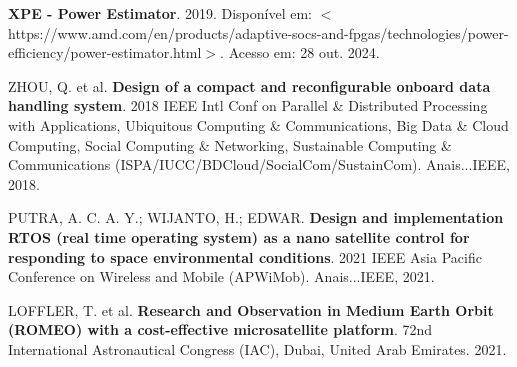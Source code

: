 \begin{flushleft}
\begin{thebibliography}{00}
 \textbf{XPE - Power Estimator}. 2019. Disponível em: $<$https://www.amd.com/en/products/adaptive-socs-and-fpgas/technologies/power-efficiency/power-estimator.html$>$. Acesso em: 28 out. 2024.





 ZHOU, Q. et al. \textbf{Design of a compact and reconfigurable onboard data handling system}. 2018 IEEE Intl Conf on Parallel \& Distributed Processing with Applications, Ubiquitous Computing \& Communications, Big Data \& Cloud Computing, Social Computing \& Networking, Sustainable Computing \& Communications (ISPA/IUCC/BDCloud/SocialCom/SustainCom). Anais...IEEE, 2018.

 PUTRA, A. C. A. Y.; WIJANTO, H.; EDWAR. \textbf{Design and implementation RTOS (real time operating system) as a nano satellite control for responding to space environmental conditions}. 2021 IEEE Asia Pacific Conference on Wireless and Mobile (APWiMob). Anais...IEEE, 2021.

 LOFFLER, T. et al. \textbf{Research and Observation in Medium Earth Orbit (ROMEO) with a cost-effective microsatellite platform}. 72nd International Astronautical Congress (IAC), Dubai, United Arab Emirates. 2021. 










\end{thebibliography}
\end{flushleft}

